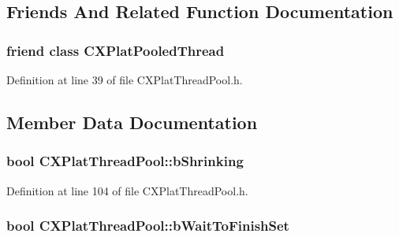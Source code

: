 \subsection{\-Friends \-And \-Related \-Function \-Documentation}
\hypertarget{class_c_x_plat_thread_pool_ae5be1bd21210186249195fa418a3bbb8}{
\subsubsection[{\-C\-X\-Plat\-Pooled\-Thread}]{\setlength{\rightskip}{0pt plus 5cm}friend class {\bf \-C\-X\-Plat\-Pooled\-Thread}}}\label{class_c_x_plat_thread_pool_ae5be1bd21210186249195fa418a3bbb8}


\-Definition at line 39 of file \-C\-X\-Plat\-Thread\-Pool.\-h.



\subsection{\-Member \-Data \-Documentation}
\hypertarget{class_c_x_plat_thread_pool_a28a2f5949bf10ec0eb0db3a65a4ade1f}{
\subsubsection[{b\-Shrinking}]{\setlength{\rightskip}{0pt plus 5cm}bool {\bf \-C\-X\-Plat\-Thread\-Pool\-::b\-Shrinking}}}\label{class_c_x_plat_thread_pool_a28a2f5949bf10ec0eb0db3a65a4ade1f}


\-Definition at line 104 of file \-C\-X\-Plat\-Thread\-Pool.\-h.

\hypertarget{class_c_x_plat_thread_pool_a119623bf09e081406a80ce845c7a8f4f}{
\subsubsection[{b\-Wait\-To\-Finish\-Set}]{\setlength{\rightskip}{0pt plus 5cm}bool {\bf \-C\-X\-Plat\-Thread\-Pool\-::b\-Wait\-To\-Finish\-Set}}}\label{class_c_x_plat_thread_pool_a119623bf09e081406a80ce845c7a8f4f}


